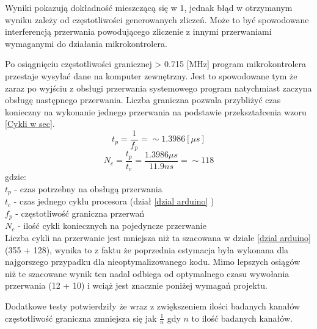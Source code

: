 Wyniki pokazują dokładność mieszczącą się w  1\textperthousand, 
jednak błąd w otrzymanym wyniku zależy od częstotliwości generowanych zliczeń.
Może to być spowodowane interferencją przerwania powodującego zliczenie z innymi przerwaniami wymaganymi do działania mikrokontrolera.

Po osiągnięciu częstotliwości granicznej > 0.715 [MHz] program mikrokontrolera przestaje wysyłać dane na komputer zewnętrzny.
Jest to spowodowane tym że zaraz po wyjściu z obsługi przerwania systemowego program natychmiast zaczyna obsługę następnego przerwania. 
Liczba graniczna pozwala przybliżyć czas konieczny na wykonanie jednego przerwania na podstawie przekształcenia wzoru \ref{Cykli w sec}. 
$$ t_p = \frac{1}{f_p} = \sim 1.3986 [\mu s] $$
$$ N_c = \frac{t_p}{t_c} =  \frac{1.3986 \mu s}{11.9 ns} =\sim 118$$
gdzie: \\
        \indent $t_p$ -  czas potrzebny na obsługą przerwania\\
        \indent $t_c$ -  czas jednego cyklu procesora (dział \ref{dzial arduino} ) \\
        \indent $f_p$ -  częstotliwość graniczna przerwań \\
        \indent $N_c$ -  ilość cykli koniecznych na pojedyncze przerwanie \\

Liczba cykli na przerwanie jest mniejsza niż ta szacowana w dziale \ref{dzial arduino} (355 + 128)\cite{ard_opt_git}, wynika to z faktu że poprzednia estymacja była wykonana dla najgorszego przypadku dla nieoptymalizowanego kodu.
Mimo lepszych osiągów niż te szacowane wynik ten nadal odbiega od optymalnego czasu wywołania przerwania (12 + 10) \cite{interupt latency} i wciąż jest znacznie poniżej wymagań projektu. 

Dodatkowe testy potwierdziły że wraz z zwiększeniem ilości badanych kanałów częstotliwość graniczna zmniejsza się jak $\frac{1}{n}$ gdy $n$ to ilość badanych kanałów. 

